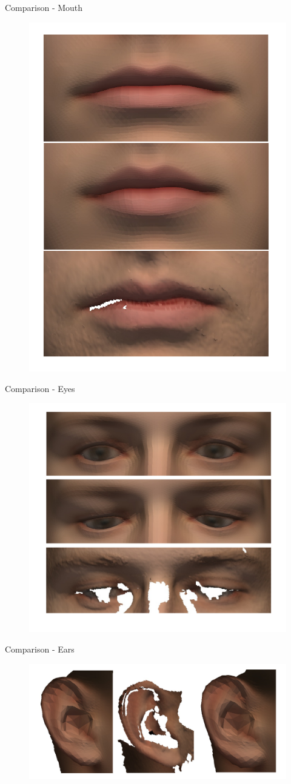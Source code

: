 \documentclass[xcolor=x11names,compress]{beamer}
\begin{document}
\begin{frame}{Comparison - Mouth}
    \begin{figure}
        \centering
        \includegraphics[width=.5\textwidth]{../resources/img/00029_mouth_comparison.pdf}
    \end{figure}
\end{frame}
\begin{frame}{Comparison - Eyes}
    \begin{figure}
        \centering
        \includegraphics[width=.8\textwidth]{../resources/img/00029_eyes_comparison.pdf}
    \end{figure}
\end{frame}

\begin{frame}{Comparison - Ears}
    \begin{figure}
        \centering
        \includegraphics[width=.8\textwidth]{../resources/img/00029_left_ear_comparison.pdf}
    \end{figure}
\end{frame}
\end{document}
